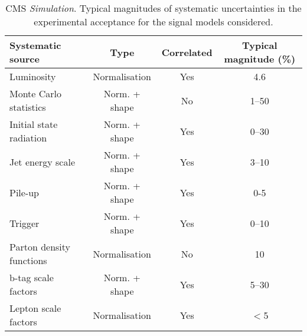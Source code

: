 \newpage
\begin{table}[h!]
  \caption{CMS {\it Simulation}. Typical magnitudes of systematic
    uncertainties in the experimental 
    acceptance for the signal models considered. 
  }
  \label{tab:signal_systs}
  \centering
  \footnotesize
  \begin{tabular}{ lccc }
    \hline
    \hline
    Systematic source              & Type          & Correlated & Typical magnitude (\%) \\
    \hline
    Luminosity                     & Normalisation & Yes        & 4.6                    \\
    Monte Carlo statistics         & Norm. + shape & No         & 1--50                  \\
    Initial state radiation        & Norm. + shape & Yes        & 0--30                  \\
    Jet energy scale               & Norm. + shape & Yes        & 3--10                  \\
    Pile-up                        & Norm. + shape & Yes        & 0-5                    \\
    Trigger                        & Norm. + shape & Yes        & 0--10                  \\
    Parton density functions       & Normalisation & No         & 10                     \\
    b-tag scale factors            & Norm. + shape & Yes        & 5--30                  \\
    Lepton scale factors           & Normalisation & Yes        & $<$5                   \\
    \hline
    \hline
  \end{tabular}
\end{table}
\newpage
